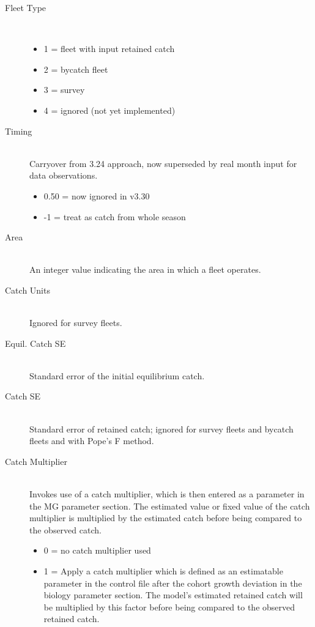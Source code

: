\begin{description}
  \item[Fleet Type] \ %
	  \begin{itemize}
	  	\item 1 = fleet with input retained catch
	  	\item 2 = bycatch fleet
	  	\item 3 = survey
	  	\item 4 = ignored (not yet implemented)
	  \end{itemize}
  \item[Timing]\hfill\\
   Carryover from 3.24 approach, now superseded by real month input for data observations.
	  \begin{itemize}
	  	\item 0.50 = now ignored in v3.30
	  	\item -1 = treat as catch from whole season
	  \end{itemize}
  \item[Area]\hfill\\
  An integer value indicating the area in which a fleet operates.
  \item[Catch Units] \hfill\\
   Ignored for survey fleets.
  \item[Equil. Catch SE] \hfill\\
  Standard error of the initial equilibrium catch.
  \item[Catch SE] \hfill\\
  Standard error of retained catch; ignored for survey fleets and bycatch fleets and with Pope's F method.
  \item[Catch Multiplier] \hfill\\
  Invokes use of a catch multiplier, which is then entered as a parameter in the MG parameter section.  The estimated value or fixed value of the catch multiplier is multiplied by the estimated catch before being compared to the observed catch. 
	  \begin{itemize}
	  	\item 0 = no catch multiplier used
	  	\item 1 = Apply a catch multiplier which is defined as an estimatable parameter in the control file after the cohort growth deviation in the biology parameter section. The model’s estimated retained catch will be multiplied by this factor before being compared to the observed retained catch.
	  \end{itemize}  
\end{description}

